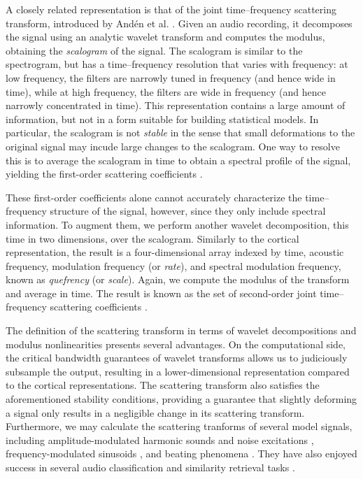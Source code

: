 \documentclass{article}
\begin{document}
A closely related representation is that of the joint time--frequency scattering transform, introduced by And\'{e}n et al. \cite{anden2015joint,anden2019joint}.
Given an audio recording, it decomposes the signal using an analytic wavelet transform and computes the modulus, obtaining the \emph{scalogram} of the signal.
The scalogram is similar to the spectrogram, but has a time--frequency resolution that varies with frequency: at low frequency, the filters are narrowly tuned in frequency (and hence wide in time), while at high frequency, the filters are wide in frequency (and hence narrowly concentrated in time).
This representation contains a large amount of information, but not in a form suitable for building statistical models.
In particular, the scalogram is not \emph{stable} in the sense that small deformations to the original signal may incude large changes to the scalogram.
One way to resolve this is to average the scalogram in time to obtain a spectral profile of the signal, yielding the first-order scattering coefficients \cite{anden2014deep}.

These first-order coefficients alone cannot accurately characterize the time--frequency structure of the signal, however, since they only include spectral information.
To augment them, we perform another wavelet decomposition, this time in two dimensions, over the scalogram.
Similarly to the cortical representation, the result is a four-dimensional array indexed by time, acoustic frequency, modulation frequency (or \emph{rate}), and spectral modulation frequency, known as \emph{quefrency} (or \emph{scale}).
Again, we compute the modulus of the transform and average in time.
The result is known as the set of second-order joint time--frequency scattering coefficients \cite{anden2015joint,anden2019joint}.

The definition of the scattering transform in terms of wavelet decompositions and modulus nonlinearities presents several advantages.
On the computational side, the critical bandwidth guarantees of wavelet transforms allows us to judiciously subsample the output, resulting in a lower-dimensional representation compared to the cortical representations.
The scattering transform also satisfies the aforementioned stability conditions, providing a guarantee that slightly deforming a signal only results in a negligible change in its scattering transform.
Furthermore, we may calculate the scattering tranforms of several model signals, including amplitude-modulated harmonic sounds and noise excitations \cite{anden2012scattering,anden2014deep}, frequency-modulated sinusoids \cite{anden2012scattering,anden2019joint}, and beating phenomena \cite{anden2014deep}.
They have also enjoyed success in several audio classification and similarity retrieval tasks \cite{anden2011multiscale,bauge2013representing,anden2014deep,anden2019joint,lostanlen2018relevance,lostanlen2018extended}.
\end{document}
